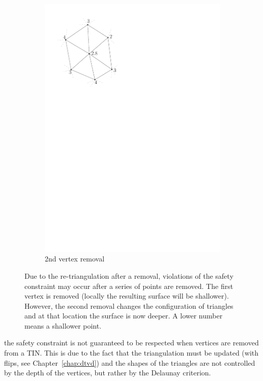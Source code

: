 \begin{figure}
\begin{subfigure}[b]{0.2\linewidth}
    \includegraphics[width=\textwidth,page=3]{figs/simpfail.pdf}
    \caption{2nd vertex removal}\label{fig:simpfail:c}
  \end{subfigure}
\caption{Due to the re-triangulation after a removal, violations of the safety constraint may occur after a series of points are removed. The first vertex is removed (locally the resulting surface will be shallower). However, the second removal changes the configuration of triangles and at that location the surface is now deeper. A lower number means a shallower point.}
\label{fig:simpfail}
\end{figure}
the safety constraint is not guaranteed to be respected when vertices are removed from a TIN.
This is due to the fact that the triangulation must be updated (with flips, see Chapter~\ref{chap:dtvd}) and the shapes of the triangles are not controlled by the depth of the vertices, but rather by the Delaunay criterion.


